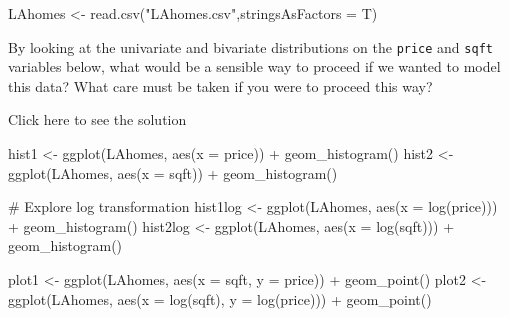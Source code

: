 \documentclass[
  letterpaper,
  DIV=11,
  numbers=noendperiod]{scrartcl}
\newenvironment{Shaded}{\begin{snugshade}}{\end{snugshade}}
\newcommand{\AttributeTok}[1]{\textcolor[rgb]{0.40,0.45,0.13}{#1}}
\newcommand{\CommentTok}[1]{\textcolor[rgb]{0.37,0.37,0.37}{#1}}
\newcommand{\FunctionTok}[1]{\textcolor[rgb]{0.28,0.35,0.67}{#1}}
\newcommand{\NormalTok}[1]{\textcolor[rgb]{0.00,0.23,0.31}{#1}}
\newcommand{\OtherTok}[1]{\textcolor[rgb]{0.00,0.23,0.31}{#1}}
\newcommand{\SpecialCharTok}[1]{\textcolor[rgb]{0.37,0.37,0.37}{#1}}
\newcommand{\StringTok}[1]{\textcolor[rgb]{0.13,0.47,0.30}{#1}}
\begin{document}
\begin{Shaded}
\begin{Highlighting}[]
\NormalTok{LAhomes }\OtherTok{\textless{}{-}} \FunctionTok{read.csv}\NormalTok{(}\StringTok{"LAhomes.csv"}\NormalTok{,}\AttributeTok{stringsAsFactors =}\NormalTok{ T)}
\end{Highlighting}
\end{Shaded}

\begin{tcolorbox}[enhanced jigsaw, titlerule=0mm, colbacktitle=quarto-callout-warning-color!10!white, opacityback=0, left=2mm, rightrule=.15mm, toptitle=1mm, opacitybacktitle=0.6, colback=white, coltitle=black, breakable, bottomrule=.15mm, arc=.35mm, bottomtitle=1mm, title={Task 1}, toprule=.15mm, leftrule=.75mm, colframe=quarto-callout-warning-color-frame]

By looking at the univariate and bivariate distributions on the
\texttt{price} and \texttt{sqft} variables below, what would be a
sensible way to proceed if we wanted to model this data? What care must
be taken if you were to proceed this way?

Click here to see the solution

\begin{Shaded}
\begin{Highlighting}[]
\NormalTok{hist1 }\OtherTok{\textless{}{-}} \FunctionTok{ggplot}\NormalTok{(LAhomes, }\FunctionTok{aes}\NormalTok{(}\AttributeTok{x =}\NormalTok{ price)) }\SpecialCharTok{+}
          \FunctionTok{geom\_histogram}\NormalTok{()}
\NormalTok{hist2 }\OtherTok{\textless{}{-}} \FunctionTok{ggplot}\NormalTok{(LAhomes, }\FunctionTok{aes}\NormalTok{(}\AttributeTok{x =}\NormalTok{ sqft)) }\SpecialCharTok{+}
          \FunctionTok{geom\_histogram}\NormalTok{()}

\CommentTok{\# Explore log transformation}
\NormalTok{hist1log }\OtherTok{\textless{}{-}} \FunctionTok{ggplot}\NormalTok{(LAhomes, }\FunctionTok{aes}\NormalTok{(}\AttributeTok{x =} \FunctionTok{log}\NormalTok{(price))) }\SpecialCharTok{+}
             \FunctionTok{geom\_histogram}\NormalTok{()}
\NormalTok{hist2log }\OtherTok{\textless{}{-}} \FunctionTok{ggplot}\NormalTok{(LAhomes, }\FunctionTok{aes}\NormalTok{(}\AttributeTok{x =} \FunctionTok{log}\NormalTok{(sqft))) }\SpecialCharTok{+}
             \FunctionTok{geom\_histogram}\NormalTok{()}

\NormalTok{plot1 }\OtherTok{\textless{}{-}} \FunctionTok{ggplot}\NormalTok{(LAhomes, }\FunctionTok{aes}\NormalTok{(}\AttributeTok{x =}\NormalTok{ sqft, }\AttributeTok{y =}\NormalTok{ price)) }\SpecialCharTok{+}
          \FunctionTok{geom\_point}\NormalTok{()}
\NormalTok{plot2 }\OtherTok{\textless{}{-}} \FunctionTok{ggplot}\NormalTok{(LAhomes, }\FunctionTok{aes}\NormalTok{(}\AttributeTok{x =} \FunctionTok{log}\NormalTok{(sqft), }\AttributeTok{y =} \FunctionTok{log}\NormalTok{(price))) }\SpecialCharTok{+}
          \FunctionTok{geom\_point}\NormalTok{()}


\end{Highlighting}
\end{Shaded}
\end{tcolorbox}
\end{document}
